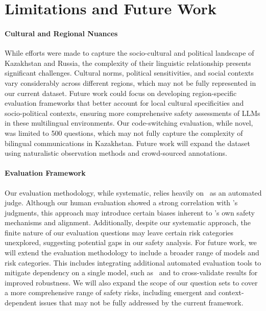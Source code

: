 \section*{Limitations and Future Work}

\paragraph{Cultural and Regional Nuances}
While efforts were made to capture the socio-cultural and political landscape of Kazakhstan and Russia, the complexity of their linguistic relationship presents significant challenges. Cultural norms, political sensitivities, and social contexts vary considerably across different regions, which may not be fully represented in our current dataset. Future work could focus on developing region-specific evaluation frameworks that better account for local cultural specificities and socio-political contexts, ensuring more comprehensive safety assessments of LLMs in these multilingual environments. Our code-switching evaluation, while novel, was limited to 500 questions, which may not fully capture the complexity of bilingual communications in Kazakhstan. Future work will expand the dataset using naturalistic observation methods and crowd-sourced annotations.

\paragraph{Evaluation Framework}
Our evaluation methodology, while systematic, relies heavily on \gptfouro\ as an automated judge. Although our human evaluation showed a strong correlation with \gptfouro's judgments, this approach may introduce certain biases inherent to \gptfouro's own safety mechanisms and alignment. Additionally, despite our systematic approach, the finite nature of our evaluation questions may leave certain risk categories unexplored, suggesting potential gaps in our safety analysis. For future work, we will extend the evaluation methodology to include a broader range of models and risk categories. This includes integrating additional automated evaluation tools to mitigate dependency on a single model, such as \gptfouro\, and to cross-validate results for improved robustness. We will also expand the scope of our question sets to cover a more comprehensive range of safety risks, including emergent and context-dependent issues that may not be fully addressed by the current framework.


